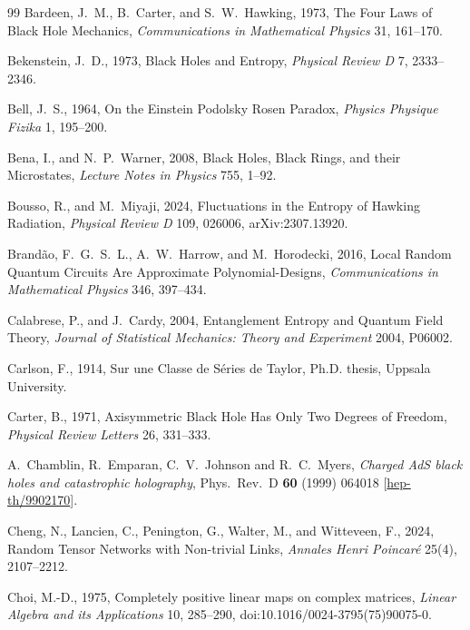 \documentclass[11pt,letterpaper]{article}
\theoremstyle{plain}
\theoremstyle{definition}
\theoremstyle{remark}
\begin{document}
\begin{thebibliography}{99}
Bardeen, J.~M., B.~Carter, and S.~W.~Hawking, 1973, The Four Laws of Black Hole Mechanics, \textit{Communications in Mathematical Physics} 31, 161--170.

Bekenstein, J.~D., 1973, Black Holes and Entropy, \textit{Physical Review D} 7, 2333--2346.

Bell, J.~S., 1964, On the Einstein Podolsky Rosen Paradox, \textit{Physics Physique Fizika} 1, 195--200.

Bena, I., and N.~P.~Warner, 2008, Black Holes, Black Rings, and their Microstates, \textit{Lecture Notes in Physics} 755, 1--92.

Bousso, R., and M.~Miyaji, 2024, Fluctuations in the Entropy of Hawking Radiation,
\textit{Physical Review D} 109, 026006, arXiv:2307.13920.

Brand\~{a}o, F.~G.~S.~L., A.~W.~Harrow, and M.~Horodecki, 2016, Local Random Quantum Circuits Are Approximate Polynomial-Designs, \textit{Communications in Mathematical Physics} 346, 397--434.

Calabrese, P., and J.~Cardy, 2004, Entanglement Entropy and Quantum Field Theory, \textit{Journal of Statistical Mechanics: Theory and Experiment} 2004, P06002.

Carlson, F., 1914, Sur une Classe de S\'{e}ries de Taylor, Ph.D. thesis, Uppsala University.

Carter, B., 1971, Axisymmetric Black Hole Has Only Two Degrees of Freedom, \textit{Physical Review Letters} 26, 331--333.

A.~Chamblin, R.~Emparan, C.~V.~Johnson and R.~C.~Myers,
\emph{Charged AdS black holes and catastrophic holography},
Phys.\ Rev.\ D \textbf{60} (1999) 064018
[\href{https://arxiv.org/abs/hep-th/9902170}{hep-th/9902170}].

Cheng, N., Lancien, C., Penington, G., Walter, M., and Witteveen, F., 2024, Random Tensor Networks with Non-trivial Links, \textit{Annales Henri Poincar\'{e}} 25(4), 2107--2212.

Choi, M.-D., 1975, Completely positive linear maps on complex matrices,
\textit{Linear Algebra and its Applications} 10, 285--290,
doi:10.1016/0024-3795(75)90075-0.


\end{thebibliography}
\end{document}
